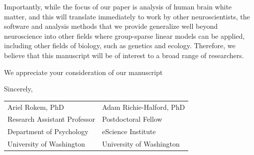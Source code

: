 \documentclass[11pt,letterpaper]{letter} %
\begin{document}
\begin{letter}{}
Importantly, while the focus of our paper is analysis of human brain white
matter, and this will translate immediately to work by other neuroscientists,
the software and analysis methods that we provide generalize well beyond
neuroscience into other fields where group-sparse linear models can be applied,
including other fields of biology, such as genetics and ecology. Therefore, we
believe that this manuscript will be of interest to a broad range of
researchers.

We appreciate your consideration of our manuscript

\hspace{1cm} Sincerely,\\

\begin{minipage}{0.8\linewidth}
\hspace{1cm}\begin{tabular}{ll}
Ariel Rokem, PhD & \hspace{1cm} Adam Richie-Halford, PhD\\
Research Assistant Professor & \hspace{1cm}  Postdoctoral Fellow \\
Department of Psychology & \hspace{1cm} eScience Institute \\
University of Washington & \hspace{1cm} University of Washington
 \end{tabular}
\end{minipage}


\end{letter}
\end{document}
